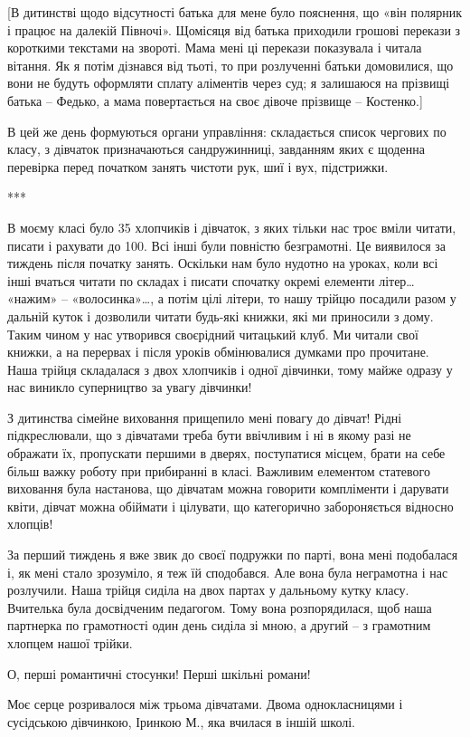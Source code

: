 [В дитинстві щодо відсутності батька для мене було пояснення, що «він полярник
і працює на далекій Півночі». Щомісяця від батька приходили грошові перекази з
короткими текстами на звороті. Мама мені ці перекази показувала і читала
вітання. Як я потім дізнався від тьоті, то при розлученні батьки домовилися, що
вони не будуть оформляти сплату аліментів через суд; я залишаюся на прізвищі
батька – Федько, а мама повертається на своє дівоче прізвище – Костенко.] 

В цей же день формуються органи управління: складається список чергових по
класу, з дівчаток призначаються сандружинниці, завданням яких є щоденна
перевірка перед початком занять чистоти рук, шиї і вух, підстрижки. 

***

В моєму класі було 35 хлопчиків і дівчаток, з яких тільки нас троє вміли
читати, писати і рахувати до 100. Всі інші були повністю безграмотні. Це
виявилося за тиждень після початку занять. Оскільки нам було нудотно на уроках,
коли всі інші вчаться читати по складах і писати спочатку окремі елементи
літер… «нажим» – «волосинка»…, а потім цілі літери, то нашу трійцю посадили
разом у дальній куток і дозволили читати будь-які книжки, які ми приносили з
дому. Таким чином у нас утворився своєрідний читацький клуб. Ми читали свої
книжки, а на перервах і після уроків обмінювалися думками про прочитане. Наша
трійця складалася з двох хлопчиків і одної дівчинки, тому майже одразу у нас
виникло суперництво за увагу дівчинки!

З дитинства сімейне виховання прищепило мені повагу до дівчат! Рідні
підкреслювали, що з дівчатами треба бути ввічливим і ні в якому разі не
ображати їх, пропускати першими в дверях, поступатися місцем, брати на себе
більш важку роботу при прибиранні в класі. Важливим елементом статевого
виховання була настанова, що дівчатам можна говорити компліменти і дарувати
квіти, дівчат можна обіймати і цілувати, що категорично забороняється відносно
хлопців!

За перший тиждень я вже звик до своєї подружки по парті, вона мені подобалася
і, як мені стало зрозуміло, я теж їй сподобався. Але вона була неграмотна і нас
розлучили. Наша трійця сиділа на двох партах у дальньому кутку класу. Вчителька
була досвідченим педагогом. Тому вона розпорядилася, щоб наша партнерка по
грамотності один день сиділа зі мною, а другий – з грамотним хлопцем нашої
трійки. 

О, перші романтичні стосунки! Перші шкільні романи!

Моє серце розривалося між трьома дівчатами. Двома однокласницями і сусідською
дівчинкою, Іринкою М., яка вчилася в іншій школі.

